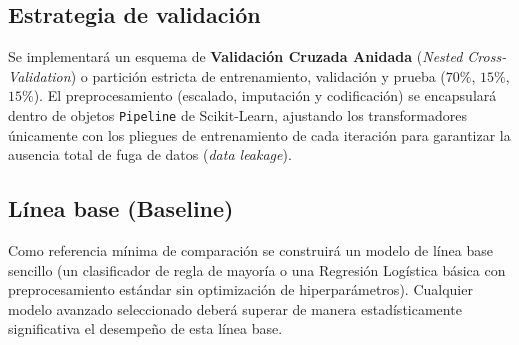 \documentclass[12pt,a4paper]{article}
\begin{document}
\subsection{Estrategia de validación}
Se implementará un esquema de \textbf{Validación Cruzada Anidada} (\textit{Nested Cross-Validation}) o partición estricta de entrenamiento, validación y prueba ($70\%$, $15\%$, $15\%$). El preprocesamiento (escalado, imputación y codificación) se encapsulará dentro de objetos \texttt{Pipeline} de Scikit-Learn, ajustando los transformadores únicamente con los pliegues de entrenamiento de cada iteración para garantizar la ausencia total de fuga de datos (\textit{data leakage}).

\subsection{Línea base (Baseline)}
Como referencia mínima de comparación se construirá un modelo de línea base sencillo (un clasificador de regla de mayoría o una Regresión Logística básica con preprocesamiento estándar sin optimización de hiperparámetros). Cualquier modelo avanzado seleccionado deberá superar de manera estadísticamente significativa el desempeño de esta línea base.
\end{document}
